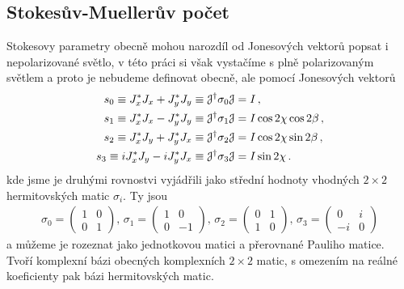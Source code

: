 \subsection{Stokesův-Muellerův počet}
\label{chap:Stokes-Mueller}

Stokesovy parametry obecně mohou narozdíl od Jonesových vektorů popsat i nepolarizované světlo,
v této práci si však vystačíme s plně polarizovaným světlem a proto je nebudeme definovat obecně, ale pomocí Jonesových vektorů
\begin{align}
    s_0 \equiv J_x^* J_x+J_y^* J_y\equiv \mathcal{J}^\dagger \sigma_0 \mathcal{J} &= I \,,\\
    s_1 \equiv J_x^* J_x-J_y^* J_y\equiv \mathcal{J}^\dagger \sigma_1 \mathcal{J} &= I \cos 2\chi \cos 2\beta \,,  \\
    s_2 \equiv J_x^* J_y+J_y^* J_x\equiv \mathcal{J}^\dagger \sigma_2 \mathcal{J} &= I \cos 2\chi \sin 2\beta \,, \\
    s_3 \equiv i J_x^* J_y-i J_y^* J_x  \equiv \mathcal{J}^\dagger \sigma_3 \mathcal{J} &= I \sin 2\chi \,.
\end{align}
kde jsme je druhými rovnostvi vyjádřili jako střední hodnoty vhodných $2\times 2$ hermitovských matic $\sigma_{i}$. Ty jsou
\begin{align}
    \sigma_0=\begin{pmatrix} 1 & 0 \\ 0 & 1 \end{pmatrix} ,\,
    \sigma_1=\begin{pmatrix} 1 & 0 \\ 0 & -1 \end{pmatrix} ,\,
    \sigma_2=\begin{pmatrix} 0 & 1 \\ 1 & 0 \end{pmatrix} ,\,
    \sigma_3=\begin{pmatrix} 0 & i \\ -i & 0 \end{pmatrix}
\end{align}
a můžeme je rozeznat jako jednotkovou matici a přerovnané Pauliho matice.
Tvoří komplexní bázi obecných komplexních $2\times 2$ matic, s omezením na reálné koeficienty pak bázi hermitovských matic. 

